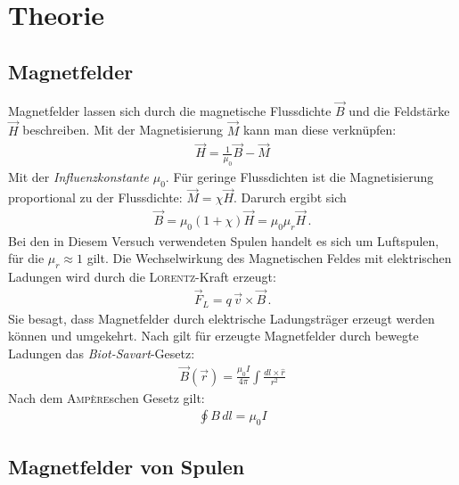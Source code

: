 \documentclass[12pt,a4paper,titlepage,headinclude,bibtotoc]{scrartcl}
\begin{document}
\section{Theorie}
\label{sec:theorie}
\subsection{Magnetfelder}
Magnetfelder lassen sich durch die magnetische Flussdichte $\vec B$ und die Feldstärke $\vec H$ beschreiben.
Mit der Magnetisierung $\vec M$ kann man diese verknüpfen:
\begin{align}
	\vec H=\frac 1{\mu_0}\vec B-\vec M
\end{align}
Mit der \emph{Influenzkonstante} $\mu_0$.
Für geringe Flussdichten ist die Magnetisierung proportional zu der Flussdichte: $\vec M=\chi\vec H$.
Darurch ergibt sich
\begin{align}
	\vec B=\mu_0(1+\chi )\vec H=\mu_0\mu_r\vec H\, .
\end{align}
Bei den in Diesem Versuch verwendeten Spulen handelt es sich um Luftspulen, für die $\mu_r\approx 1$ gilt.
Die Wechselwirkung des Magnetischen Feldes mit elektrischen Ladungen wird durch die \textsc{Lorentz}-Kraft erzeugt:
\begin{align}
	\vec F_L=q\,\vec v\times \vec B\,.\label{eq:Lorentz}
\end{align}
Sie besagt, dass Magnetfelder durch elektrische Ladungsträger erzeugt werden können und umgekehrt.
Nach \cite[S.215]{griffith} gilt für erzeugte Magnetfelder durch bewegte Ladungen das \emph{Biot-Savart}-Gesetz:
\begin{align}
	\vec B(\vec r)=\frac{\mu_0 I}{4\pi}\int\frac{dl\times \hat r}{r^2}\label{eq:Biot}
\end{align}
Nach dem \textsc{Ampère}schen Gesetz gilt:
\begin{align}
	\oint B\, dl=\mu_0I\label{eq:mu}
\end{align}

\subsection{Magnetfelder von Spulen}
\end{document}
